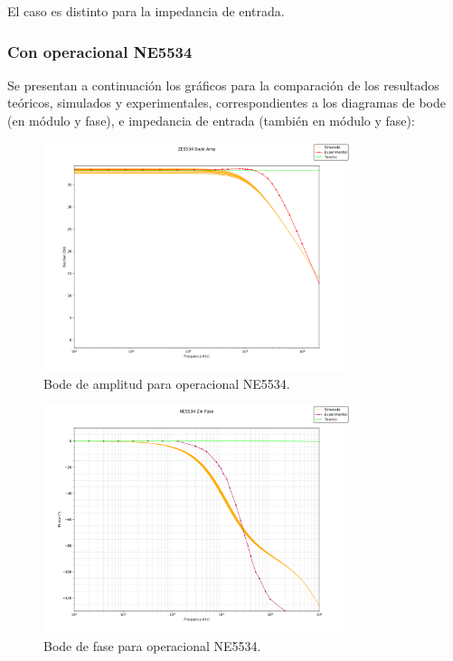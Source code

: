 El caso es distinto para la impedancia de entrada.


\subsubsection{Con operacional NE5534}
Se presentan a continuación los gráficos para la comparación de los resultados teóricos, simulados y experimentales, correspondientes a los diagramas de bode (en módulo y fase), e impedancia de entrada (también en módulo y fase):
\begin{figure}[H]
    \begin{minipage}{\textwidth}
        \centering
        \includegraphics[width=0.8\textwidth]{../EJ2/recursos_para_el_informe/NE5534_Bode_Amp}
        \caption{Bode de amplitud para operacional NE5534.}
        \label{fig:NE5534_Bode_Amp}
    \end{minipage}\hfill
\end{figure}
\begin{figure}[H]
    \begin{minipage}{\textwidth}
        \centering
        \includegraphics[width=0.8\textwidth]{../EJ2/recursos_para_el_informe/NE5534_Bode_Fase}
        \caption{Bode de fase para operacional NE5534.}
        \label{fig:NE5534_Bode_Fase}
    \end{minipage}\hfill
\end{figure}
